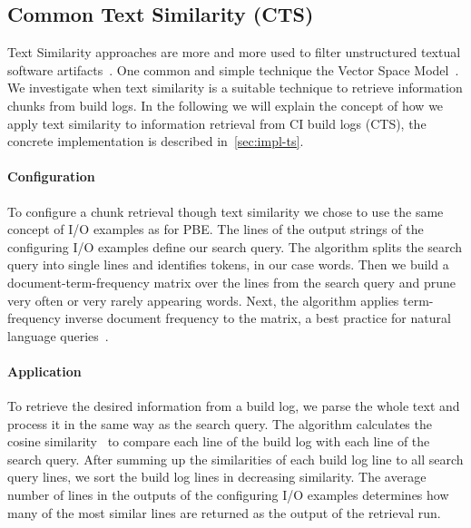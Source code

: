 \documentclass[\myrootdir/main.tex]{subfiles}
\begin{document}
\subsection{Common Text Similarity (CTS)}
\label{sec:expl-ts}
Text Similarity approaches are more and more used to filter unstructured textual software artifacts~\cite{runeson2007detection,marcus2005recovery,antoniol2002recovering,mccarey2006recommending}.
One common and simple technique the Vector Space Model~\cite{schutze2008introduction}.
We investigate when text similarity is a suitable technique to retrieve information chunks from build logs.
In the following we will explain the concept of how we apply text similarity to information retrieval from CI build logs (CTS), the concrete implementation is described in~\ref{sec:impl-ts}.

\paragraph{Configuration}
To configure a chunk retrieval though text similarity we chose to use the same concept of I/O examples as for PBE\@.
The lines of the output strings of the configuring I/O examples define our search query.
The algorithm splits the search query into single lines and identifies tokens, in our case words.
Then we build a document-term-frequency matrix over the lines from the search query and prune very often or very rarely appearing words.
Next, the algorithm applies term-frequency inverse document frequency to the matrix, a best practice for natural language queries~\cite{lee1997document}.

\paragraph{Application}
To retrieve the desired information from a build log, we parse the whole text and process it in the same way as the search query.
The algorithm calculates the cosine similarity~\cite{korenius2007principal} to compare each line of the build log with each line of the search query.
After summing up the similarities of each build log line to all search query lines, we sort the build log lines in decreasing similarity.
The average number of lines in the outputs of the configuring I/O examples determines how many of the most similar lines are returned as the output of the retrieval run.
\end{document}
